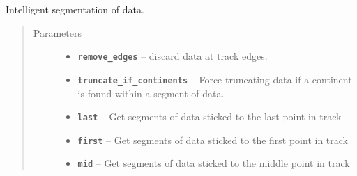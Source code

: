 \documentclass[letterpaper,10pt,english]{sphinxmanual}
\begin{document}
\begin{fulllineitems}
\label{altimetry.tools.spectrum:altimetry.tools.spectrum.get_segment}
Intelligent segmentation of data.
\begin{quote}\begin{description}
\item[{Parameters}] \leavevmode\begin{itemize}
\item {} 
\textbf{\texttt{remove\_edges}} -- discard data at track edges.

\item {} 
\textbf{\texttt{truncate\_if\_continents}} -- Force truncating data if a continent is found within a segment of data.

\item {} 
\textbf{\texttt{last}} -- Get segments of data sticked to the last point in track

\item {} 
\textbf{\texttt{first}} -- Get segments of data sticked to the first point in track

\item {} 
\textbf{\texttt{mid}} -- Get segments of data sticked to the middle point in track

\end{itemize}

\end{description}\end{quote}

\end{fulllineitems}

\end{document}
